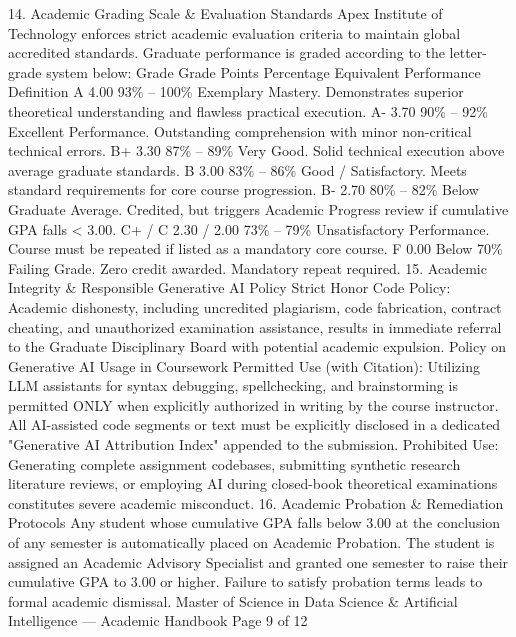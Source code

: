 14. Academic Grading Scale \& Evaluation Standards
Apex Institute of Technology enforces strict academic evaluation criteria to maintain global accredited standards.
Graduate performance is graded according to the letter-grade system below:
Grade
Grade
Points
Percentage
Equivalent
Performance Definition
A
4.00
93\% – 100\%
Exemplary Mastery. Demonstrates superior theoretical understanding and
flawless practical execution.
A-
3.70
90\% – 92\%
Excellent Performance. Outstanding comprehension with minor non-critical
technical errors.
B+
3.30
87\% – 89\%
Very Good. Solid technical execution above average graduate standards.
B
3.00
83\% – 86\%
Good / Satisfactory. Meets standard requirements for core course progression.
B-
2.70
80\% – 82\%
Below Graduate Average. Credited, but triggers Academic Progress review if
cumulative GPA falls < 3.00.
C+ /
C
2.30 / 2.00
73\% – 79\%
Unsatisfactory Performance. Course must be repeated if listed as a mandatory
core course.
F
0.00
Below 70\%
Failing Grade. Zero credit awarded. Mandatory repeat required.
15. Academic Integrity \& Responsible Generative AI Policy
Strict Honor Code Policy: Academic dishonesty, including uncredited plagiarism, code fabrication, contract
cheating, and unauthorized examination assistance, results in immediate referral to the Graduate Disciplinary
Board with potential academic expulsion.
Policy on Generative AI Usage in Coursework
Permitted Use (with Citation): Utilizing LLM assistants for syntax debugging, spellchecking, and brainstorming is
permitted ONLY when explicitly authorized in writing by the course instructor. All AI-assisted code segments or text must
be explicitly disclosed in a dedicated "Generative AI Attribution Index" appended to the submission.
Prohibited Use: Generating complete assignment codebases, submitting synthetic research literature reviews, or
employing AI during closed-book theoretical examinations constitutes severe academic misconduct.
16. Academic Probation \& Remediation Protocols
Any student whose cumulative GPA falls below 3.00 at the conclusion of any semester is automatically placed on
Academic Probation. The student is assigned an Academic Advisory Specialist and granted one semester to raise
their cumulative GPA to 3.00 or higher. Failure to satisfy probation terms leads to formal academic dismissal.
Master of Science in Data Science \& Artificial Intelligence — Academic Handbook
Page 9 of 12

